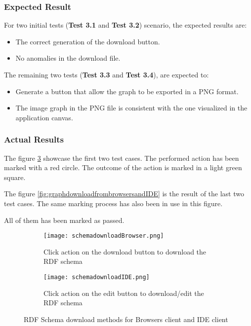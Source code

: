 \subsubsection{Expected Result}

For two initial tests (\textbf{Test 3.1} and \textbf{Test 3.2}) scenario, the expected results are:
\begin{itemize}
    \item The correct generation of the download button.
    \item No anomalies in the download file. 
\end{itemize}

The remaining two tests (\textbf{Test 3.3} and \textbf{Test 3.4}), are expected to:
\begin{itemize}
    \item Generate a button that allow the graph to be exported in a PNG format. 
    \item The image graph in the PNG file is consistent with the one visualized in the application canvas.
\end{itemize}

\subsubsection{Actual Results}

The figure \ref{fig:schemadownload} showcase the first two test cases. The performed action has been marked with a red circle.
The outcome of the action is marked in a light green square. 

The figure \ref{fig:graphdownloadfrombrowsersandIDE} is the result of the last two test cases. The same marking process has also been in use in this figure.

All of them has been marked as passed.
\\

\begin{figure}[htb]
    \centering
    \begin{subfigure}[b]{0.48\textwidth}
        \centering
        \texttt{[image: schemadownloadBrowser.png]}
        \caption{Click action on the download button to download the RDF schema}
        \label{fig:RDFschemadownloadA}
    \end{subfigure}
    \hfill
    \begin{subfigure}[b]{0.48\textwidth}
        \centering
        \texttt{[image: schemadownloadIDE.png]}
        \caption{Click action on the edit button to download/edit the RDF schema}
        \label{fig:RDFschemadownloadB}
    \end{subfigure}
    \caption{RDF Schema download methods for Browsers client and IDE client}
    \label{fig:schemadownload}
\end{figure}

